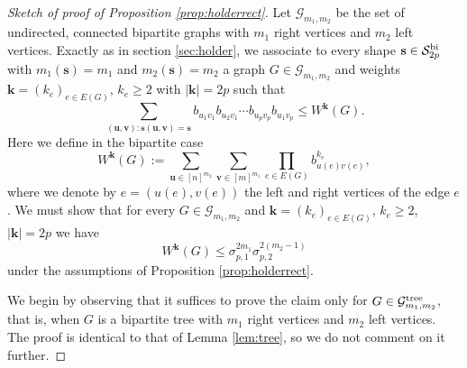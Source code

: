 \documentclass[10pt,reqno]{amsart}
\theoremstyle{definition}
\numberwithin{equation}{section}
\numberwithin{figure}{section}
\numberwithin{table}{section}
\begin{document}
\begin{proof}[Sketch of proof of Proposition \ref{prop:holderrect}]
Let $\mathcal{G}_{m_1,m_2}$ be the set of undirected, connected 
bipartite graphs with $m_1$ right vertices and $m_2$ left vertices.
Exactly as in section \ref{sec:holder}, we 
associate to every shape $\mathbf{s}\in\mathcal{S}_{2p}^{\rm bi}$ with 
$m_1(\mathbf{s})=m_1$ and $m_2(\mathbf{s})=m_2$ a graph 
$G\in\mathcal{G}_{m_1,m_2}$ and weights $\mathbf{k}=(k_e)_{e\in E(G)}$, 
$k_e\ge 2$ with $|\mathbf{k}|=2p$ such that
$$
	\sum_{(\mathbf{u},\mathbf{v}):
	\mathbf{s}(\mathbf{u},\mathbf{v})=\mathbf{s}}
	b_{u_1v_1}b_{u_2v_1}\cdots b_{u_pv_p}b_{u_1v_p}
	\le W^{\mathbf{k}}(G).
$$
Here we define in the bipartite case
$$
	W^{\mathbf{k}}(G) :=
	\sum_{\mathbf{u}\in[n]^{m_2}}
	\sum_{\mathbf{v}\in[m]^{m_1}}
	\prod_{e\in E(G)}
	b_{u(e)v(e)}^{k_e},
$$
where we denote by $e=(u(e),v(e))$ the left and right vertices of 
the edge $e$. We must show that for every $G\in\mathcal{G}_{m_1,m_2}$
and $\mathbf{k}=(k_e)_{e\in E(G)}$, $k_e\ge 2$, $|\mathbf{k}|=2p$ we have
$$
	W^{\mathbf{k}}(G)
        \le \sigma_{p,1}^{2m_1}
        \sigma_{p,2}^{2(m_2-1)}
$$
under the assumptions of Proposition \ref{prop:holderrect}.

We begin by observing that it suffices to prove the claim only for
$G\in\mathcal{G}_{m_1,m_2}^{\rm tree}$, that is, when $G$ is a bipartite 
tree with $m_1$ right vertices and $m_2$ left vertices. The proof is 
identical to that of Lemma \ref{lem:tree}, so we do not comment on it 
further.


\end{proof}
\end{document}
